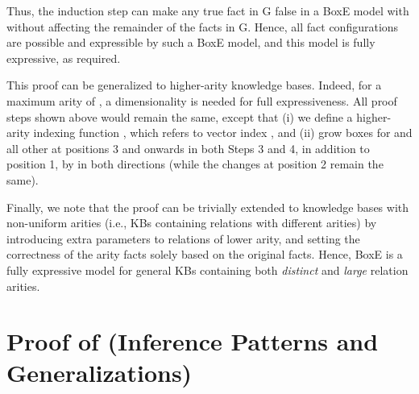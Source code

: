 \documentclass{article}
\begin{document}
Thus, the induction step can make any true fact  in G false in a BoxE model with  without affecting the remainder of the facts in G. Hence, all fact configurations are possible and expressible by such a BoxE model, and this model is fully expressive, as required.

This proof can be generalized to higher-arity knowledge bases. Indeed, for a maximum arity of , a dimensionality  is needed for full expressiveness. All proof steps shown above would remain the same, except that (i) we define a higher-arity indexing function , which refers to vector index , and (ii) grow boxes for  and all other  at positions 3 and onwards in both Steps 3 and 4, in addition to position 1, by  in both directions (while the changes at position 2 remain the same). 

Finally, we note that the proof can be trivially extended to knowledge bases with non-uniform arities (i.e., KBs containing relations with different arities) by introducing extra parameters to relations of lower arity, and setting the correctness of the arity facts solely based on the original facts. Hence, BoxE is a fully expressive model for general KBs containing both \emph{distinct} and \emph{large} relation arities.

\section{Proof of  (Inference Patterns and Generalizations)}
\label{app:infPat}
\end{document}
